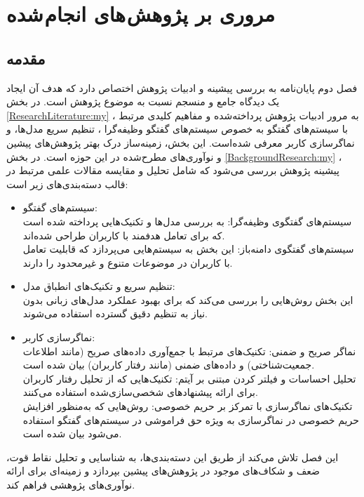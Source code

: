 \chapter{مروری بر پژوهش های انجام شده}
\section{مقدمه}
فصل دوم پایان‌نامه به 
بررسی پیشینه%
 و 
ادبیات پژوهش%
 اختصاص دارد که هدف آن ایجاد یک دیدگاه جامع و منسجم نسبت به موضوع پژوهش است. در بخش 
\ref{ResearchLiterature:my}
، به مرور ادبیات پژوهش پرداخته‌شده و مفاهیم کلیدی مرتبط با سیستم‌های گفتگو به خصوص سیستم‌های گفتگو وظیفه‌گرا ، تنظیم سریع مدل‌ها، و نماگر‌سازی کاربر معرفی شده‌است. این بخش، زمینه‌ساز درک بهتر پژوهش‌های پیشین و نوآوری‌های مطرح‌شده در این حوزه است. در بخش 
\ref{BackgroundResearch:my}
، پیشینه پژوهش بررسی می‌شود که شامل تحلیل و مقایسه مقالات علمی مرتبط در قالب دسته‌بندی‌های زیر است:
\begin{itemize}
\item
 سیستم‌های گفتگو:\\
سیستم‌های گفتگوی وظیفه‌گرا: به بررسی مدل‌ها و تکنیک‌هایی پرداخته شده است که برای تعامل هدفمند با کاربران طراحی شده‌اند.\\
سیستم‌های گفتگوی دامنه‌باز: این بخش به سیستم‌هایی می‌پردازد که قابلیت تعامل با کاربران در موضوعات متنوع و غیرمحدود را دارند.
\item
تنظیم سریع و تکنیک‌های انطباق مدل:\\
این بخش روش‌هایی را بررسی می‌کند که برای بهبود عملکرد مدل‌های زبانی بدون نیاز به تنظیم دقیق گسترده استفاده می‌شوند.
\item
نماگر‌سازی کاربر:\\
نماگر صریح و ضمنی: تکنیک‌های مرتبط با جمع‌آوری داده‌های صریح (مانند اطلاعات جمعیت‌شناختی) و داده‌های ضمنی (مانند رفتار کاربران) بیان شده است.\\
تحلیل احساسات و فیلتر کردن مبتنی بر آیتم: تکنیک‌هایی که از تحلیل رفتار کاربران برای ارائه پیشنهادهای شخصی‌سازی‌شده استفاده می‌کنند.\\
تکنیک‌های نماگر‌سازی با تمرکز بر حریم خصوصی: روش‌هایی که به‌منظور افزایش حریم خصوصی در نماگر‌سازی به ویژه حق فراموشی در سیستم‌های گفتگو استفاده می‌شود بیان شده است.

\end{itemize}
این فصل تلاش می‌کند از طریق این دسته‌بندی‌ها، به شناسایی و تحلیل نقاط قوت، ضعف و شکاف‌های موجود در پژوهش‌های پیشین بپردازد و زمینه‌ای برای ارائه نوآوری‌های پژوهشی فراهم کند.

